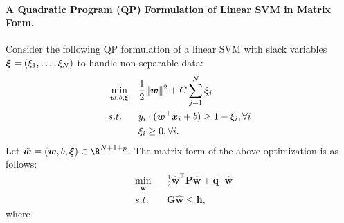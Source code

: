     \paragraph{A Quadratic Program (QP) Formulation of Linear SVM in Matrix Form.}
    Consider the following QP formulation of a linear SVM with slack variables $\bm{\xi} = (\xi_1, \ldots, \xi_N)$ to handle non-separable data: 
            \begin{equation}
                \begin{aligned}
                    & \min_{\bm{w}, b, \bm{\xi} } & & \frac{1}{2}\lVert\bm{w}\rVert^2  + C \sum_{j=1}^{N}{\xi_j} \\
                    & s.t.             & & y_i \cdot (\bm{w}^\top \bm{x}_i + b) \ge 1 - \xi_i, \forall i \\
                    &                  & & \xi_i \ge 0, \forall i.
                \end{aligned}
            \end{equation}
    Let $\hat{\bm{w}} = (\bm{w}, b, \bm{\xi}) \in \R^{\ndata + 1 + \nfeat}$.
    The matrix form of the above optimization is as follows:
            \begin{equation}
                \begin{aligned}
                    & \min_{ \hat{\bm{w}} } & & \frac{1}{2} \hat{\bm{w}}^\top \bm{P} \hat{\bm{w}}  + \bm{q}^\top \hat{\bm{w}}\\
                    & s.t.             & & \bm{G} \hat{\bm{w}} \le \bm{h},
                \end{aligned}
            \end{equation}
    where
